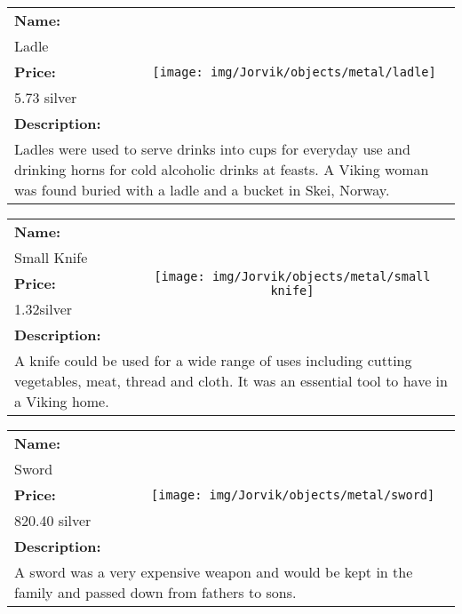 \begin{table}[ht!]
	\centering
	\begin{tabular}{ p{3cm} c }\toprule
		\textbf{Name:} & \multirow{5}{*}{\texttt{[image: img/Jorvik/objects/metal/ladle]}}\\
		Ladle & \\ 
		\textbf{Price:} & \\
		5.73 silver & \\ 
		\textbf{Description:} & \\
		\multicolumn{2}{p{12cm}}{Ladles were used to serve drinks into cups for everyday use and drinking horns for cold alcoholic drinks at feasts. A Viking woman was found buried with a ladle and a bucket in Skei, Norway.}\\
		\bottomrule
	\end{tabular}
\end{table}

\begin{table}[ht!]
	\centering
	\begin{tabular}{ p{3cm} c }\toprule
		\textbf{Name:} & \multirow{5}{*}{\texttt{[image: img/Jorvik/objects/metal/small knife]}}\\
		Small Knife & \\ 
		\textbf{Price:} & \\
		1.32silver & \\ 
		\textbf{Description:} & \\
		\multicolumn{2}{p{12cm}}{A knife could be used for a wide range of uses including cutting vegetables, meat, thread and cloth. It was an essential tool to have in a Viking home.}\\
		\bottomrule
	\end{tabular}
\end{table}

\begin{table}[ht!]
	\centering
	\begin{tabular}{ p{3cm} c }\toprule
		\textbf{Name:} & \multirow{5}{*}{\texttt{[image: img/Jorvik/objects/metal/sword]}}\\
		Sword & \\ 
		\textbf{Price:} & \\
		820.40 silver & \\ 
		\textbf{Description:} & \\
		\multicolumn{2}{p{12cm}}{A sword was a very expensive weapon and would be kept in the family and passed down from fathers to sons.}\\
		\bottomrule
	\end{tabular}
\end{table}

